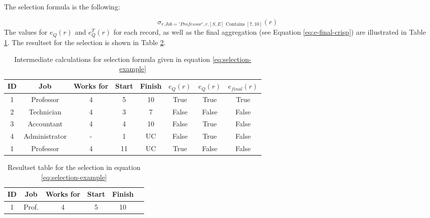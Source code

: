 \begin{example}
\begin{table}


\end{table}


The selection formula is the following:

\begin{equation}
 \label{eq:selection-example}
\sigma_{r.Job = 'Professor', r.\left[S, E \right] \mbox{ Contains } \left[7, 10\right]} \left(r \right)
\end{equation}
The values for $e_Q(r)$ and $e_Q^T(r)$ for each record, as well as the final aggregation (see Equation \eqref{eq:e-final-crisp}) are illustrated in Table \ref{table:crisp-intermediate-calculations-employees}.
The resultset for the selection is shown in Table \ref{table:example-selection}.
\end{example}

\begin{table}
\centering
\caption[Intermediate calculations.]{Intermediate calculations for selection formula given in equation \eqref{eq:selection-example}}
\vspace{2mm}

\begin{tabular}{c c c c c c c c }
\hline
ID & Job & Works for & Start & Finish & $e_Q(r)$& $e_Q(r)$ & $e_{final}(r)$\\ \hline
1 & Professor & 4 & 5 & 10 & True & True & True\\
2 & Technician & 4 & 3 & 7 & False & False & False\\
3 & Accountant & 4  & 4 & 10 & False & True & False\\
4 & Administrator & - & 1 & UC & False & True & False\\
1 & Professor & 4 & 11 & UC & True & False & False\\
\hline 
\end{tabular}
\label{table:crisp-intermediate-calculations-employees}



\end{table}



\begin{table}
\centering
\caption{Resultset table for the selection in equation \eqref{eq:selection-example}}
\vspace{2mm}
\begin{tabular}{c c c c c c }
\hline
ID & Job & Works for & Start & Finish \\ \hline
1 & Prof. & 4 & 5 & 10 \\
\hline 
\end{tabular}
\label{table:example-selection}



\end{table}

